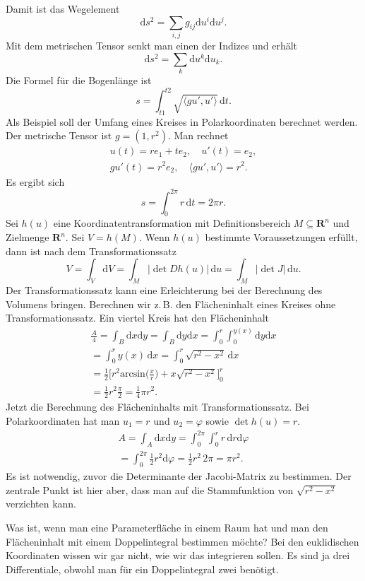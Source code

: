 \documentclass[a4paper,10pt,fleqn,twocolumn,twoside]{article}
\begin{document}
Damit ist das Wegelement
\[\mathrm ds^2 = \sum_{i,j} g_{ij}\mathrm du^i\mathrm du^j.\]
Mit dem metrischen Tensor senkt man einen der Indizes
und erhält
\[\mathrm ds^2 = \sum_{k}\mathrm du^k\mathrm du_k.\]
Die Formel für die Bogenlänge ist
\[s = \int_{t1}^{t2}
\sqrt{\langle gu',u'\rangle}\,\mathrm dt.\]
%
Als Beispiel soll der Umfang eines Kreises in Polarkoordinaten
berechnet werden. Der metrische Tensor ist $g=(1,r^2)$.
Man rechnet
\begin{gather*}
u(t)=re_1+te_2,\quad
u'(t) = e_2,\\
gu'(t) = r^2e_2,\quad
\langle gu',u'\rangle = r^2.
\end{gather*}
Es ergibt sich
\[s = \int_0^{2\pi} r\,\mathrm dt = 2\pi r.\]
%
Sei $h(u)$ eine Koordinatentransformation mit Definitionsbereich
$M\subseteq\mathbf R^n$ und Zielmenge $\mathbf R^n$.
Sei $V=h(M)$. Wenn $h(u)$ bestimmte Voraussetzungen erfüllt,
dann ist nach dem Transformationssatz
\[V = \int_V \mathrm dV = \int_M |{\det Dh(u)}|\,\mathrm du
= \int_M |{\det J}|\,\mathrm du.\]
Der Transformationssatz kann eine Erleichterung bei der Berechnung
des Volumens bringen. Berechnen wir z.\,B. den Flächeninhalt eines
Kreises ohne Transformationssatz. Ein viertel Kreis hat den
Flächeninhalt
\begin{gather*}
\frac{A}{4} = \int_B \mathrm dx\mathrm dy
= \int_B \mathrm dy\mathrm dx
= \int_{0}^r\int_{0}^{y(x)} \mathrm dy\mathrm dx\\
= \int_{0}^r y(x)\,\mathrm dx
= \int_{0}^r \sqrt{r^2-x^2}\,\mathrm dx\\
= \frac{1}{2}\Big[r^2\mathrm{arcsin}\Big(\frac{x}{r}\Big)
+ x\sqrt{r^2-x^2}\Big]_0^r\\
= \frac{1}{2} r^2 \frac{\pi}{2}
= \frac{1}{4}\pi r^2.
\end{gather*}
Jetzt die Berechnung des Flächeninhalts mit Transformationssatz.
Bei Polarkoordinaten hat man $u_1=r$ und $u_2=\varphi$
sowie $\det h(u)=r$.
\begin{gather*}
A = \int_A \mathrm dx\mathrm dy
= \int_0^{2\pi}\int_0^r r\,\mathrm dr\mathrm d\varphi\\
= \int_0^{2\pi} \frac{1}{2}r^2\mathrm d\varphi
= \frac{1}{2}r^2\,2\pi = \pi r^2.
\end{gather*}
Es ist notwendig, zuvor die Determinante der Jacobi-Matrix zu
bestimmen. Der zentrale Punkt ist hier aber, dass man auf die
Stammfunktion von $\sqrt{r^2-x^2}$ verzichten kann.

Was ist, wenn man eine Parameterfläche in einem Raum hat und man den
Flächeninhalt mit einem Doppelintegral bestimmen möchte? Bei den
euklidischen Koordinaten wissen wir gar nicht, wie wir das integrieren
sollen. Es sind ja drei Differentiale, obwohl man für ein
Doppelintegral zwei benötigt.
\end{document}
